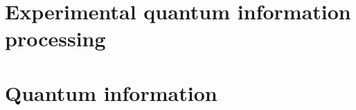 \documentclass[en]{sol-man}
\begin{document}
\section{Experimental quantum information processing}

\section{Quantum information}
\ifx\allfiles\undefined
\end{document}
